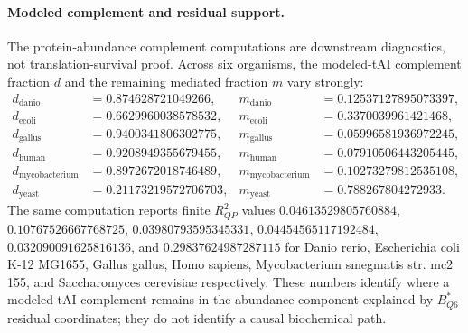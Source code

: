 \paragraph{Modeled complement and residual support.}
The protein-abundance complement computations are downstream diagnostics, not translation-survival proof.  Across six organisms, the modeled-tAI complement fraction $d$ and the remaining mediated fraction $m$ vary strongly:
$$
\begin{aligned}
d_{\mathrm{danio}} &= 0.874628721049266, & m_{\mathrm{danio}} &= 0.12537127895073397,\\
d_{\mathrm{ecoli}} &= 0.6629960038578532, & m_{\mathrm{ecoli}} &= 0.3370039961421468,\\
d_{\mathrm{gallus}} &= 0.9400341806302775, & m_{\mathrm{gallus}} &= 0.05996581936972245,\\
d_{\mathrm{human}} &= 0.9208949355679455, & m_{\mathrm{human}} &= 0.07910506443205445,\\
d_{\mathrm{mycobacterium}} &= 0.8972672018746489, & m_{\mathrm{mycobacterium}} &= 0.10273279812535108,\\
d_{\mathrm{yeast}} &= 0.21173219572706703, & m_{\mathrm{yeast}} &= 0.788267804272933.
\end{aligned}
$$
The same computation reports finite $R^2_{QP}$ values $0.04613529805760884$, $0.10767526667768725$, $0.03980793595345331$, $0.04454565117192484$, $0.032090091625816136$, and $0.29837624987287115$ for Danio rerio, Escherichia coli K-12 MG1655, Gallus gallus, Homo sapiens, Mycobacterium smegmatis str. mc2 155, and Saccharomyces cerevisiae respectively.  These numbers identify where a modeled-tAI complement remains in the abundance component explained by $B^{\ast}_{Q6}$ residual coordinates; they do not identify a causal biochemical path.

